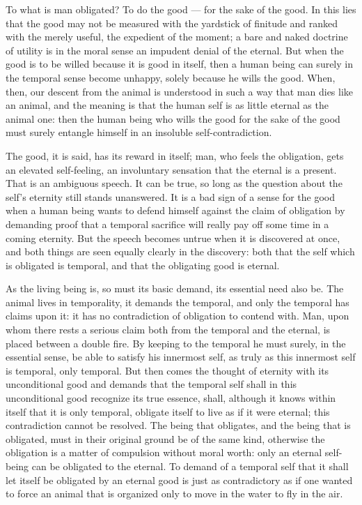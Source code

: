 \documentclass[12pt,a4paper,openany]{book}
\newcommand{\opage}[1]{\marginnote{\footnotesize\textit{[#1]}}}
\begin{document}
To what is man obligated? To do the good --- for the sake of the good. In this lies that the good may not be measured with
the yardstick of finitude and ranked with the merely useful, the expedient of the moment; a bare and naked doctrine of
utility is in the moral sense an
\setcounter{footnote}{0}%
\opage{39}impudent denial of the eternal. But when the good is to be willed because it is good in itself, then a human being can
surely in the temporal sense become unhappy, solely because he wills the good. When, then, our descent from the animal is
understood in such a way that man dies like an animal, and the meaning is that the human self is as little eternal as the
animal one: then the human being who wills the good for the sake of the good must surely entangle himself in an insoluble
self-contradiction.


The good, it is said, has its reward in itself; man, who feels the obligation, gets an elevated self-feeling, an involuntary
sensation that the eternal is a present. That is an ambiguous speech. It can be true, so long as the question about the
self's eternity still stands unanswered. It is a bad sign of a sense for the good when a human being wants to defend himself
against the claim of obligation by demanding proof that a temporal sacrifice will really pay off some time in a coming
eternity. But the speech becomes untrue when it is discovered at once, and both things are seen equally clearly in the
discovery: both that the self which is obligated is temporal, and that the obligating good is eternal.

As the living being is, so must its basic demand, its essential need also be. The animal lives in temporality, it demands the
temporal, and only the temporal has claims upon it: it has no contradiction of obligation to contend with. Man, upon whom
there rests a serious claim both from the temporal and the eternal, is placed between a double fire. By keeping to the
temporal he must surely, in the essential sense, be able to satisfy his innermost self, as truly as this innermost self is
temporal, only temporal. But then comes the thought of eternity with its unconditional good and demands that the temporal
self shall in this unconditional good recognize its true essence, shall, although it knows within itself that it is only
temporal, obligate itself to live as if it were eternal; this contradiction cannot be resolved. The being that obligates,
\setcounter{footnote}{0}%
\opage{40}and the being that is obligated, must in their original ground be of the same kind, otherwise the obligation is a
matter of compulsion without moral worth: only an eternal self-being can be obligated to the eternal. To demand of a temporal
self that it shall let itself be obligated by an eternal good is just as contradictory as if one wanted to force an animal
that is organized only to move in the water to fly in the air.
\end{document}
